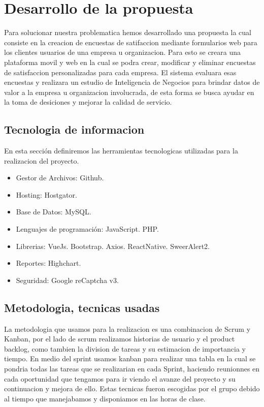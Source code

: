 \documentclass[twoside,twocolumn]{article}
\begin{document}
\section{Desarrollo de la propuesta}
Para solucionar nuestra problematica hemos desarrollado una propuesta la cual consiste en la creacion de encuestas de satifaccion mediante formularios web para los clientes usuarios de una empresa u organizacion. Para esto se creara una plataforma movil y web en la cual se podra crear, modificar y eliminar encuestas de satisfaccion personalizadas para cada empresa. El sistema evaluara esas encuestas y realizara un estudio de Inteligencia de Negocios para brindar datos de valor a la empresa u organizacion involucrada, de esta forma se busca ayudar en la toma de desiciones y mejorar la calidad de servicio.

\subsection{Tecnologia de informacion}
En esta sección definiremos las herramientas tecnologicas utilizadas para la realizacion del proyecto.
\begin{itemize}
\item Gestor de Archivos:
\subitem Github.
\item Hosting:
\subitem Hostgator.
\item Base de Datos:
\subitem MySQL.
\item Lenguajes de programación:
\subitem JavaScript.
\subitem PHP.
\item Librerias:
\subitem VueJs.
\subitem Bootstrap.
\subitem Axios.
\subitem ReactNative.
\subitem SweerAlert2.
\item Reportes:
\subitem Highchart.
\item Seguridad:
\subitem Google reCaptcha v3.
\end{itemize}

\subsection{Metodologia, tecnicas usadas}
La metodologia que usamos para la realizacion es una combinacion de Scrum y Kanban, por el lado de scrum realizamos historias de usuario y el product backlog, como tambien la division de tareas y su estimacion de importancia y tiempo. En medio del sprint usamos kanban para realizar una tabla en la cual se pondria todas las tareas que se realizarian en cada Sprint, haciendo reunionnes en cada oportunidad que tengamos para ir viendo el avanze del proyecto y su continuacion y mejora de ello. Estas tecnicas fueron escogidas por el grupo debido al tiempo que manejabamos y disponiamos en las horas de clase.
\end{document}
